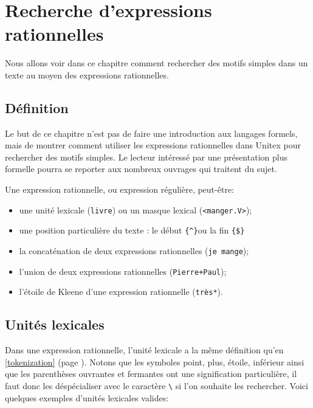 \chapter{Recherche d’expressions rationnelles}
\label{chap-regexp}

Nous allons voir dans ce chapitre comment rechercher des motifs simples dans un texte
au moyen des expressions rationnelles.

\section{Définition}

Le but de ce chapitre n’est pas de faire une introduction aux langages formels, mais
de montrer comment utiliser les expressions rationnelles dans Unitex pour rechercher des
motifs simples. Le lecteur intéressé par une présentation plus formelle pourra se reporter
aux nombreux ouvrages qui traitent du sujet.


\bigskip \noindent Une expression rationnelle, ou expression régulière, peut-être:

\begin{itemize}
  \item une unité lexicale (\verb+livre+) ou un masque lexical
  (\verb+<manger.V>+);
  \item une position particulière du texte : le début \verb+{^}+ou la fin \verb+{$}+
  \item la concaténation de deux expressions rationnelles (\verb+je mange+);
  \item l'union de deux expressions rationnelles (\verb$Pierre+Paul$); 
  \item l’étoile de Kleene d’une expression rationnelle (\verb+très*+).
\end{itemize}


\section{Unités lexicales}

Dans une expression rationnelle, l’unité lexicale a la même définition qu’en \ref{tokenization}
(page \pageref{tokenization}). Notons que les symboles point, plus, étoile, inférieur ainsi que les
parenthèses ouvrantes et fermantes ont une signification particulière, il faut donc les
déspécialiser avec le caractère \verb+\+ si l’on souhaite les rechercher. Voici quelques exemples
d’unités lexicales valides: \index{\verb+\+}

